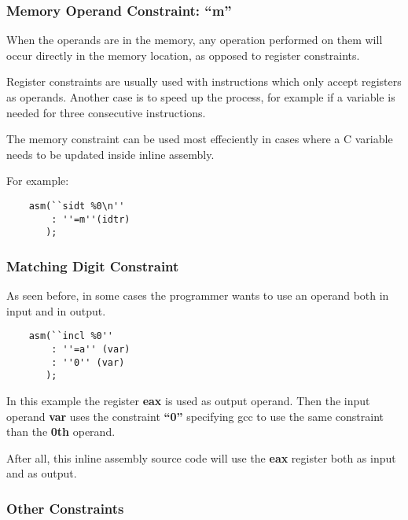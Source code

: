 {\begin{frame}
\begin{center}
  \end{center}
\end{frame}


\begin{frame}[containsverbatim]
  \frametitle{Memory Operand Constraint: \textbf{``m''}}

  When the operands are in the memory, any operation performed on them
  will occur directly in the memory location, as opposed to register
  constraints.

  \nl

  Register constraints are usually used with instructions which only accept
  registers as operands. Another case is to speed up the process, for example
  if a variable is needed for three consecutive instructions.

  \nl

  The memory constraint can be used most effeciently in cases where a C
  variable needs to be updated inside inline assembly.

  \nl

  For example:

  \begin{verbatim}
    asm(``sidt %0\n''
        : ''=m''(idtr)
       );
  \end{verbatim}
\end{frame}


\begin{frame}[containsverbatim]
  \frametitle{Matching Digit Constraint}

  As seen before, in some cases the programmer wants to use an operand
  both in input and in output.

  \begin{verbatim}
    asm(``incl %0''
        : ''=a'' (var)
        : ''0'' (var)
       );
  \end{verbatim}

  In this example the register \textbf{eax} is used as output operand.
  Then the input operand \textbf{var} uses the constraint \textbf{``0''}
  specifying gcc to use the same constraint than the \textbf{0th} operand.

  \nl

  After all, this inline assembly source code will use the \textbf{eax}
  register both as input and as output.
\end{frame}


\begin{frame}
  \frametitle{Other Constraints}


\end{frame}}

